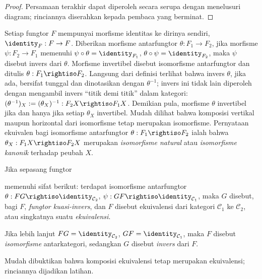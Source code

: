\begin{proof}
	Persamaan terakhir dapat diperoleh secara serupa dengan menelusuri diagram; rinciannya diserahkan kepada pembaca yang berminat.
\end{proof}

Setiap fungtor $F$ mempunyai morfisme identitas ke dirinya sendiri, $\identity_F : F \to F$. Diberikan morfisme antarfungtor $\theta: F_1 \to F_2$, jika morfisme $\psi: F_2 \to F_1$ memenuhi $\psi \circ \theta = \identity_{F_1}$, $\theta \circ \psi = \identity_{F_2}$, maka $\psi$ disebut invers dari $\theta$. Morfisme invertibel disebut isomorfisme antarfungtor dan ditulis $\theta: F_1 \rightiso F_2$. Langsung dari definisi terlihat bahwa invers $\theta$, jika ada, bersifat tunggal dan dinotasikan dengan $\theta^{-1}$; invers ini tidak lain diperoleh dengan mengambil invers ``titik demi titik'' dalam kategori: $(\theta^{-1})_X := (\theta_X)^{-1}: F_2 X \rightiso F_1 X$. Demikian pula, morfisme $\theta$ invertibel jika dan hanya jika setiap $\theta_X$ invertibel. Mudah dilihat bahwa komposisi vertikal maupun horizontal dari isomorfisme tetap merupakan isomorfisme. Pernyataan ekuivalen bagi isomorfisme antarfungtor $\theta: F_1 \rightiso F_2$ ialah bahwa $\theta_X: F_1 X \rightiso F_2 X$ merupakan \emph{isomorfisme natural} atau \emph{isomorfisme kanonik} terhadap peubah $X$.

\begin{definition}[Ekuivalensi]\label{def:cat-equivalence}
	Jika sepasang fungtor
	memenuhi sifat berikut: terdapat isomorfisme antarfungtor $\theta: FG \rightiso \identity_{\mathcal{C}_2}$, $\psi: GF \rightiso \identity_{\mathcal{C}_1}$, maka $G$ disebut, bagi $F$, \emph{fungtor kuasi-invers}, dan $F$ disebut ekuivalensi dari kategori $\mathcal{C}_1$ ke $\mathcal{C}_2$, atau singkatnya suatu \emph{ekuivalensi}.

	Jika lebih lanjut $FG = \identity_{\mathcal{C}_2}$, $GF = \identity_{\mathcal{C}_1}$, maka $F$ disebut \emph{isomorfisme} antarkategori, sedangkan $G$ disebut \emph{invers} dari $F$.
\end{definition}
Mudah dibuktikan bahwa komposisi ekuivalensi tetap merupakan ekuivalensi; rinciannya dijadikan latihan.


